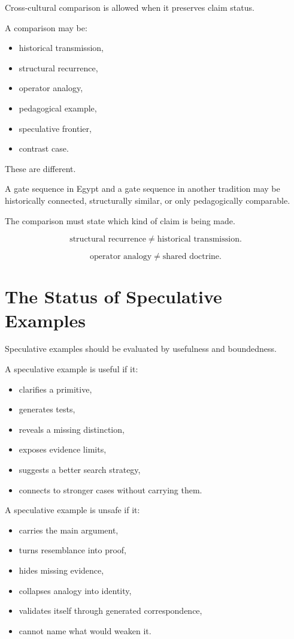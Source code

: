 \documentclass[11pt]{book}
\begin{document}
Cross-cultural comparison is allowed when it preserves claim status.

A comparison may be:

\begin{itemize}
    \item historical transmission,
    \item structural recurrence,
    \item operator analogy,
    \item pedagogical example,
    \item speculative frontier,
    \item contrast case.
\end{itemize}

These are different.

A gate sequence in Egypt and a gate sequence in another tradition may be historically connected, structurally similar, or only pedagogically comparable.

The comparison must state which kind of claim is being made.

\[
\text{structural recurrence} \neq \text{historical transmission}.
\]

\[
\text{operator analogy} \neq \text{shared doctrine}.
\]

\section{The Status of Speculative Examples}

Speculative examples should be evaluated by usefulness and boundedness.

A speculative example is useful if it:

\begin{itemize}
    \item clarifies a primitive,
    \item generates tests,
    \item reveals a missing distinction,
    \item exposes evidence limits,
    \item suggests a better search strategy,
    \item connects to stronger cases without carrying them.
\end{itemize}

A speculative example is unsafe if it:

\begin{itemize}
    \item carries the main argument,
    \item turns resemblance into proof,
    \item hides missing evidence,
    \item collapses analogy into identity,
    \item validates itself through generated correspondence,
    \item cannot name what would weaken it.
\end{itemize}
\end{document}
